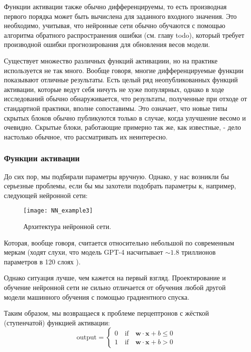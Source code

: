 Функции активации также обычно дифференцируемы, то есть производная первого порядка 
может быть вычислена для заданного входного значения. Это необходимо, учитывая, что 
нейронные сети обычно обучаются с помощью алгоритма обратного распространения ошибки 
(см. главу {\color{red} todo}), 
который требует производной ошибки прогнозирования для обновления весов модели.

Существует множество различных функций активациии, но на практике используется не 
так много. Вообще говоря, многие дифференцируемые функции показывают отличные результаты. 
Есть целый ряд неопубликованных функций активации, которые ведут
себя ничуть не хуже популярных, однако в ходе исследований обычно 
обнаруживается, что результаты, полученные при отходе от стандартной практики, 
вполне сопоставимы. Это означает, что новые типы скрытых блоков
обычно публикуются только в случае, когда улучшение весомо и очевидно. Скрытые
блоки, работающие примерно так же, как известные, - дело настолько обычное, что
рассматривать их неинтересно.

\subsubsection{Функции активации}

До сих пор, мы подбирали параметры вручную. Однако, у нас возникли бы серьезные 
проблемы, если бы мы захотели подобрать параметры к, например, следующей нейронной сети:

\begin{figure}[h!]
    \centering
    \texttt{[image: NN\_example3]}
    \caption{Архитектура нейронной сети.}
    \label{fig:NN3}
\end{figure}

Которая, вообще говоря, считается относительно небольшой по современным меркам 
(ходят слухи, что модель GPT-4 насчитывает $\sim 1.8$ триллионов параметров в 
120 слоях \cite{gpt4_architecture}).

Однако ситуация лучше, чем кажется на первый взгляд. 
Проектирование и обучение нейронной сети не сильно отличается от обучения 
любой другой модели машинного обучения с помощью градиентного спуска. 

Таким образом, мы возвращаеся к проблеме перцептронов с жёсткой (ступенчатой) 
функцией активации:
\begin{equation*}
    \text{output} = \begin{cases}
        0 \quad \text{if} \quad \bm{w} \cdot \bm{x} + b \leq 0 \\
        1 \quad \text{if} \quad \bm{w} \cdot \bm{x} + b > 0 
    \end{cases}
\end{equation*}

